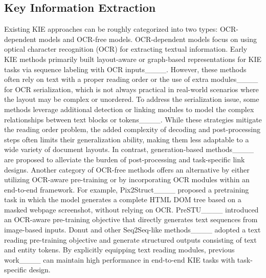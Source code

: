    \subsection{Key Information Extraction} 
Existing KIE approaches can be roughly categorized into two types: OCR-dependent models and OCR-free models. OCR-dependent models focus on using optical character recognition (OCR) for extracting textual information. Early KIE methods primarily built layout-aware or graph-based representations for KIE tasks via sequence labeling with OCR inputs____. However, these methods often rely on text with a proper reading order or the use of extra modules____ for OCR serialization, which is not always practical in real-world scenarios where the layout may be complex or unordered.
To address the serialization issue, some methods leverage additional detection or linking modules to model the complex relationships between text blocks or tokens____. While these strategies mitigate the reading order problem, the added complexity of decoding and post-processing steps often limits their generalization ability, making them less adaptable to a wide variety of document layouts.
In contrast, generation-based methods____ are proposed to alleviate the burden of post-processing and task-specific link designs. Another category of OCR-free methods offers an alternative by either utilizing OCR-aware pre-training or by incorporating OCR modules within an end-to-end framework.
For example, Pix2Struct____ proposed a pretraining task in which the model generates a complete HTML DOM tree based on a masked webpage screenshot, without relying on OCR.
PreSTU____ introduced an OCR-aware pre-training objective that directly generates text sequences from image-based inputs. Donut and other Seq2Seq-like methods____ adopted a text reading pre-training objective and generate structured outputs consisting of text and entity tokens.
By explicitly equipping text reading modules, previous work____ can maintain high performance in end-to-end KIE tasks with task-specific design.


